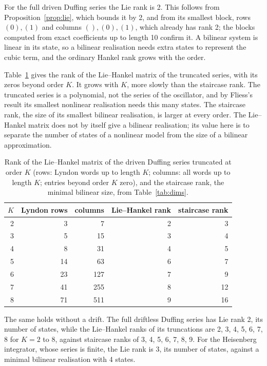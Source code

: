 \documentclass[11pt,a4paper]{article}
\theoremstyle{remark}
\begin{document}
For the full driven Duffing series the Lie rank is 2.
This follows from Proposition~\ref{prop:lie}, which bounds it by 2, and from its smallest block, rows $(0),(1)$ and columns $(),(0),(1)$, which already has rank 2; the blocks computed from exact coefficients up to length 10 confirm it.
A bilinear system is linear in its state, so a bilinear realisation needs extra states to represent the cubic term, and the ordinary Hankel rank grows with the order.

Table~\ref{tab:lie} gives the rank of the Lie--Hankel matrix of the truncated series, with its zeros beyond order $K$.
It grows with $K$, more slowly than the staircase rank.
The truncated series is a polynomial, not the series of the oscillator, and by Fliess's result its smallest nonlinear realisation needs this many states.
The staircase rank, the size of its smallest bilinear realisation, is larger at every order.
The Lie--Hankel matrix does not by itself give a bilinear realisation; its value here is to separate the number of states of a nonlinear model from the size of a bilinear approximation.

\begin{table}[t]\centering\small
\caption{Rank of the Lie--Hankel matrix of the driven Duffing series truncated at order $K$ (rows: Lyndon words up to length $K$; columns: all words up to length $K$; entries beyond order $K$ zero), and the staircase rank, the minimal bilinear size, from Table~\ref{tab:dims}.}\label{tab:lie}
\begin{tabular}{rrrrr}\toprule
$K$ & Lyndon rows & columns & Lie--Hankel rank & staircase rank\\\midrule
2 & 3 & 7 & 2 & 3\\
3 & 5 & 15 & 3 & 4\\
4 & 8 & 31 & 4 & 5\\
5 & 14 & 63 & 6 & 7\\
6 & 23 & 127 & 7 & 9\\
7 & 41 & 255 & 8 & 12\\
8 & 71 & 511 & 9 & 16\\
\bottomrule\end{tabular}
\end{table}

The same holds without a drift.
The full driftless Duffing series has Lie rank 2, its number of states, while the Lie--Hankel ranks of its truncations are 2, 3, 4, 5, 6, 7, 8 for $K=2$ to 8, against staircase ranks of 3, 4, 5, 6, 7, 8, 9.
For the Heisenberg integrator, whose series is finite, the Lie rank is 3, its number of states, against a minimal bilinear realisation with 4 states.
\end{document}
